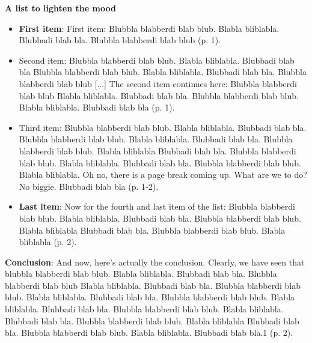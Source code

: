 \documentclass[10pt,a4paper,draft]{report}
\begin{document}
\setlength{\leftskip}{0cm}

\textbf{A list to lighten the mood}

\begin{itemize}
\item \textbf{First item}: First item: Blubbla blabberdi blab blub. Blabla bliblabla. Blubbadi blab bla. Blubbla blabberdi blab blub (p. 1).
\item Second item: Blubbla blabberdi blab blub. Blabla bliblabla. Blubbadi blab bla Blubbla blabberdi blab blub. Blabla bliblabla. Blubbadi blab bla. Blubbla blabberdi blab blub [...] The second item continues here: Blubbla blabberdi blab blub Blabla bliblabla. Blubbadi blab bla. Blubbla blabberdi blab blub. Blabla bliblabla. Blubbadi blab bla (p. 1).
\item Third item: Blubbla blabberdi blab blub. Blabla bliblabla. Blubbadi blab bla. Blubbla blabberdi blab blub. Blabla bliblabla. Blubbadi blab bla. Blubbla blabberdi blab blub. Blabla bliblabla Blubbadi blab bla. Blubbla blabberdi blab blub. Blabla bliblabla. Blubbadi blab bla. Blubbla blabberdi blab blub. Blabla bliblabla. Oh no, there is a page break coming up. What are we to do? No biggie. Blubbadi blab bla  (p. 1-2).
\item \textbf{Last item}: Now for the fourth and last item of the list: Blubbla blabberdi blab blub. Blabla bliblabla. Blubbadi blab bla. Blubbla blabberdi blab blub. Blabla bliblabla Blubbadi blab bla. Blubbla blabberdi blab blub. Blabla bliblabla (p. 2).
\end{itemize}

\textbf{Conclusion}: 
And now, here’s actually the conclusion. Clearly, we have seen that blubbla blabberdi blab blub. Blabla bliblabla. Blubbadi blab bla. Blubbla blabberdi blab blub Blabla bliblabla. Blubbadi blab bla. Blubbla blabberdi blab blub. Blabla bliblabla. Blubbadi blab bla. Blubbla blabberdi blab blub. Blabla bliblabla. Blubbadi blab bla. Blubbla blabberdi blab blub. Blabla bliblabla. Blubbadi blab bla. Blubbla blabberdi blab blub. Blabla bliblabla Blubbadi blab bla. Blubbla blabberdi blab blub. Blabla bliblabla. Blubbadi blab bla.1  (p. 2).\\
\end{document}
